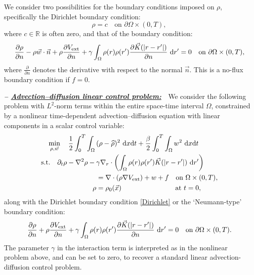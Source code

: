 We consider two possibilities for the boundary conditions imposed on $\rho$, specifically the Dirichlet boundary condition:
\begin{equation}
\ \label{Dirichlet} \rho=c\quad\text{on }\partial\Omega\times(0,T),
\end{equation}
where $c \in \mathbb{R}$ is often zero, and that of the boundary condition:
\begin{equation}
\ \label{NoFlux} \frac{\partial\rho}{\partial{}n}-\rho\vec{w}\cdot\vec{n}+\rho\frac{\partial{}V_{\text{ext}}}{\partial{}n} +\gamma\int_{\Omega}\rho(r)\rho(r') \frac{ \partial\vec{K}(|r-r'|)}{\partial{}n}~{\rm d}r'=0\quad\text{on }\partial\Omega\times(0,T),
\end{equation}
where $\frac{\partial}{\partial{}n}$ denotes the derivative with respect to the normal $\vec{n}$. This is a no-flux boundary condition if $f=0$.

\vspace{0.75em}

\textbf{\emph{-- \underline{Advection--diffusion linear control problem:}}}~~We consider the following problem with $L^2$-norm terms within the entire space-time interval $\Omega$, constrained by a nonlinear time-dependent advection--diffusion equation with linear components in a scalar control variable:
\begin{align}
\ \label{AdvDiff_Linear} \min_{\rho,\vec{w}}~~~\frac{1}{2}\int_0^T\int_{\Omega}{}&(\rho-\widehat{\rho})^2~{\rm d}x{\rm d}t+\frac{\beta}{2}\int_0^T\int_{\Omega}w^2~{\rm d}x{\rm d}t \\
\ \nonumber \text{s.t.}\quad\partial_{t}\rho-\nabla^{2}\rho-{}&\gamma\nabla_{r}\cdot\left(\int_{\Omega}\rho(r)\rho(r')\vec{K}(|r-r'|)~{\rm d}r'\right)\\
&=\nabla\cdot(\rho\nabla{}V_{\text{ext}})+w+f\quad\text{on }\Omega\times(0,T), \\
\ \nonumber \rho&{}=\rho_{0}(\vec{x})\quad\hspace{6.8em}\text{at }t=0,
\end{align}
along with the Dirichlet boundary condition \eqref{Dirichlet} or the `Neumann-type' boundary condition:
\begin{equation}
\ \label{NoFlux_Linear} \frac{\partial\rho}{\partial{}n}+\rho\frac{\partial{}V_{\text{ext}}}{\partial{}n}+\gamma\int_{\Omega}\rho(r)\rho(r') \frac{ \partial\vec{K}(|r-r'|)}{\partial{}n}~{\rm d}r'=0\quad\text{on }\partial\Omega\times(0,T).
\end{equation}
The parameter $\gamma$ in the interaction term is interpreted as in the nonlinear problem above, and can be set to zero, to recover a standard linear advection-diffusion control problem. 
\vspace{0.75em}


